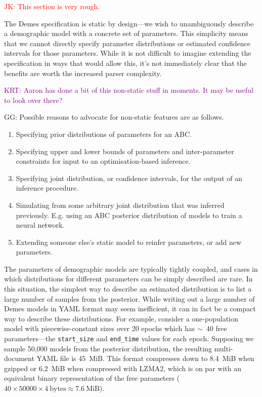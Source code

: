 \documentclass[11pt]{article}
\newcommand{\jkcomment}[1]{{\textcolor{red}{JK: #1}}}
\newcommand{\ggcomment}[1]{{\textcolor{yellow!60!red}{GG: #1}}}
\newcommand{\krtcomment}[1]{{\textcolor{purple}{KRT: #1}}}
\begin{document}
\jkcomment{This section is very rough.}


The Demes specification is static by design---we wish to
unambiguously describe a demographic model with a concrete set
of parameters. This simplicity means that we cannot directly
specify parameter distributions or estimated confidence intervals
for those parameters. While it is not difficult to imagine extending
the specification in ways that would allow this, it's not immediately
clear that the benefits are worth the increased parser complexity.

\krtcomment{Aaron has done a bit of this non-static stuff in moments.  It may be useful to look over there?}

\ggcomment{
Possible reasons to advocate for non-static features are as follows.
\begin{enumerate}
\item Specifying prior distributions of parameters for an ABC.
\item Specifying upper and lower bounds of parameters and inter-parameter
      constraints for input to an optimisation-based inference.
\item Specifying joint distribution, or confidence intervals, for the output of
      an inference procedure.
\item Simulating from some arbitrary joint distribution that was inferred
      previously. E.g. using an ABC posterior distribution of models to
      train a neural network.
\item Extending someone else's static model to reinfer parameters,
      or add new parameters.
\end{enumerate}
}

The parameters of
demographic models are typically tightly coupled, and cases in which
distributions for different parameters can be simply described are rare.
In this situation, the simplest way to describe an estimated
distribution is to list a large number of samples from
the posterior. While writing out a large number of Demes models in
YAML format may seem inefficient, it can in fact be a compact
way to describe these distributions.
For example, consider a one-population model with piecewise-constant sizes over
20 epochs which has $\sim$~40 free parameters---the \texttt{start\_size} and
\texttt{end\_time} values for each epoch. Supposing we sample 50,000 models
from the posterior distribution, the resulting multi-document YAML file is
45~MiB.
This format compresses down to 8.4~MiB when gzipped or 6.2~MiB
when compressed with LZMA2, which is on par with an equivalent binary
representation of the free parameters
($40\times50000\times4~\text{bytes} \approx 7.6~\text{MiB}$).
\end{document}
